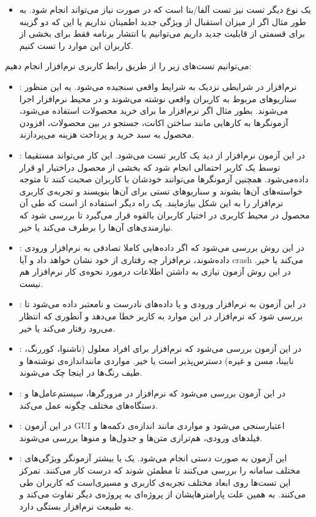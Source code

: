 {\begin{itemize}
\item
یک نوع دیگر تست نیز تست آلفا/بتا است که در صورت نیاز می‌تواند انجام شود. به طور مثال اگر از میزان استقبال از ویژگی جدید اطمینان نداریم یا این که دو گزینه برای قسمتی از قابلیت جدید داریم می‌توانیم با انتشار برنامه فقط برای بخشی از کاربران این موارد را تست کنیم.
 
  
\end{itemize}
	
می‌توانیم تست‌های زیر را از طریق رابط کاربری نرم‌‌افزار انجام دهیم:
\begin{itemize}
\item {}:
نرم‌افزار در شرایطی نزدیک به شرایط واقعی سنجیده می‌شود. یه این منظور سناریوهای مربوط به کاربران واقعی نوشته می‌شوند و در محیط نرم‌افزار اجرا می‌شوند. بطور مثال اگر نرم‌افزار ما برای خرید محصولات استفاده می‌شود، آزمونگرها به کارهایی مانند ساختن اکانت، جستجو در بین محصولات، افزودن محصول به سبد خرید و پرداخت هزینه می‌پردازند.
\item {}:
در این آزمون نرم‌افزار از دید یک کاربر تست می‌شود. این کار می‌تواند مستقیما توسط یک کاربر احتمالی انجام شود که بخشی از محصول دراختیار او قرار داده‌می‌شود. همچنین آزمونگرها می‌توانند خودشان با کاربران صحبت کنند تا متوجه خواسته‌های آن‌ها بشوند و سناریوهای تستی برای آن‌ها بنویسند و تجربه‌ی کاربری نرم‌افزار را به این شکل بیازمایند. یک راه دیگر استفاده از  است که طی آن محصول در محیط کاربری در اختیار کاربران بالقوه قرار می‌گیرد تا بررسی شود که نیازمندی‌های آن‌ها را برطرف می‌کند یا خیر.
\item {}:
در این روش بررسی می‌شود که اگر داده‌هایی کاملا تصادفی به نرم‌افزار ورودی داده‌شوند، نرم‌افزار چه رفتاری از خود نشان خواهد داد و آیا crash می‌کند یا خیر. در این روش آزمون نیازی به داشتن اطلاعات درمورد نحوه‌ی کار نرم‌افزار هم نیست.
\item {}:
در این آزمون به نرم‌افزار ورودی‌ و یا داده‌های نادرست و نامعتبر داده‌ می‌شود تا بررسی شود که نرم‌افزار در این موارد به کاربر خطا می‌دهد و آنطوری که انتظار می‌رود رفتار می‌کند یا خیر.
\item {}:
در این آزمون بررسی می‌شود که نرم‌افزار برای افراد معلول (ناشنوا، کوررنگ، نابینا، مسن و غیره) دسترس‌پذیر است یا خیر. مواردی ماننداندازه‌ی نوشته‌ها و طیف رنگ‌ها در اینجا چک می‌شوند.
\item {}:
در این آزمون بررسی می‌شود که نرم‌افزار در مرورگرها، سیستم‌عامل‌ها و دستگاه‌های مختلف چگونه عمل می‌کند.
\item {}:
در این آزمون GUI اعتبارسنجی می‌شود و مواردی مانند اندازه‌ی دکمه‌ها و فیلدهای ورودی، هم‌ترازی متن‌ها و جدول‌ها و منوها بررسی می‌شوند.
\item {}:
این آزمون به صورت دستی انجام می‌شود. یک یا بیشتر آزمونگر ویژگی‌های مختلف سامانه را بررسی می‌کنند تا مطمئن شوند که درست کار می‌کنند. تمرکز این تست‌ها روی ابعاد مختلف تجربه‌ی کاربری و مسیری‌است که کاربران طی می‌کنند. به همین علت پارامترهایشان از پروژه‌ای به پروژه‌ی دیگر تفاوت می‌کند و به طبیعت  نرم‌افزار‌ بستگی دارد.
\end{itemize}


}
